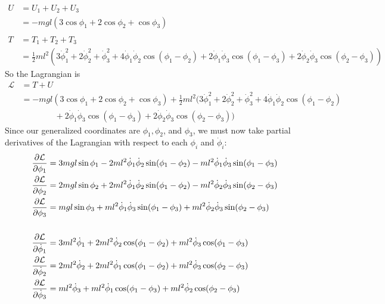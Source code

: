 \documentclass{article}
\renewcommand{\L}{\mathcal{L}}
\begin{document}
\begin{appendices}
\begin{align}
        U &= U_1 + U_2 + U_3 \\
        &= -mgl\left(3\cos\phi_1+2\cos\phi_2+\cos\phi_3 \right) \\\\
        T &= T_1 + T_2 + T_3 \\
        &= \frac{1}{2}ml^2 \left( 3\dot\phi_1^2+2\dot\phi_2^2+\dot\phi_3^2
           + 4\dot\phi_1\dot\phi_2\cos(\phi_1-\phi_2)
           + 2\dot\phi_1\dot\phi_3\cos(\phi_1-\phi_3)
           + 2\dot\phi_2\dot\phi_3\cos(\phi_2-\phi_3) \right) 
    \end{align}
    So the Lagrangian is
    \begin{align}
        \L &= T + U \\
        &= -mgl\left(3\cos\phi_1+2\cos\phi_2+\cos\phi_3 \right) 
           + \frac{1}{2}ml^2 \bigl( 3\dot\phi_1^2+2\dot\phi_2^2+\dot\phi_3^2
           + 4\dot\phi_1\dot\phi_2\cos(\phi_1-\phi_2) \\
        &\qquad\qquad + 2\dot\phi_1\dot\phi_3\cos(\phi_1-\phi_3)
           + 2\dot\phi_2\dot\phi_3\cos(\phi_2-\phi_3) \bigr) 
    \end{align}
    Since our generalized coordinates are $\phi_1,\phi_2$, and $\phi_3$, we must
    now take partial derivatives of the Lagrangian with respect to each $\phi_i$
    and $\dot\phi_i$:
    \begin{align}
        \pD{\L}{\phi_1} &= 3mgl\sin\phi_1 
            -2ml^2\dot\phi_1\dot\phi_2\sin(\phi_1-\phi_2)
            -ml^2\dot\phi_1\dot\phi_3\sin(\phi_1-\phi_3) \\
        \pD{\L}{\phi_2} &= 2mgl\sin\phi_2 
            +2ml^2\dot\phi_1\dot\phi_2\sin(\phi_1-\phi_2)
            -ml^2\dot\phi_2\dot\phi_3\sin(\phi_2-\phi_3) \\
        \pD{\L}{\phi_3} &= mgl\sin\phi_3 
            +ml^2\dot\phi_1\dot\phi_3\sin(\phi_1-\phi_3)
            +ml^2\dot\phi_2\dot\phi_3\sin(\phi_2-\phi_3) \\\\
        \pD{\L}{\dot\phi_1} &= 3ml^2\dot\phi_1 
            + 2ml^2\dot\phi_2\cos(\phi_1-\phi_2) 
            + ml^2\dot\phi_3\cos(\phi_1-\phi_3)  \\
        \pD{\L}{\dot\phi_2} &= 2ml^2\dot\phi_2 
            + 2ml^2\dot\phi_1\cos(\phi_1-\phi_2) 
            + ml^2\dot\phi_3\cos(\phi_2-\phi_3)  \\
        \pD{\L}{\dot\phi_3} &= ml^2\dot\phi_3 
            + ml^2\dot\phi_1\cos(\phi_1-\phi_3) 
            + ml^2\dot\phi_2\cos(\phi_2-\phi_3) 

\end{align}
\end{appendices}
\end{document}
